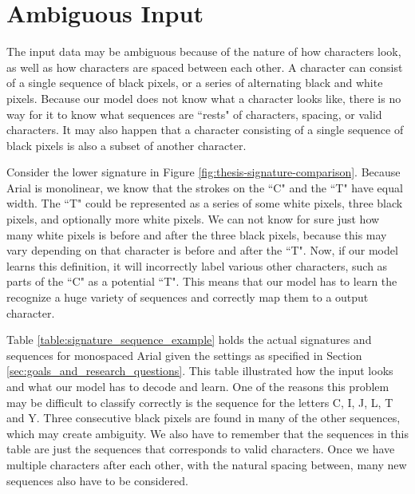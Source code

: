 
\section{Ambiguous Input}
\label{sec:ambiguous_input}
The input data may be ambiguous because of the nature of how characters look, as well as how characters are spaced between each other. A character can consist of a single sequence of black pixels, or a series of alternating black and white pixels. Because our model does not know what a character looks like, there is no way for it to know what sequences are ``rests" of characters, spacing, or valid characters. It may also happen that a character consisting of a single sequence of black pixels is also a subset of another character. 

Consider the lower signature in Figure \ref{fig:thesis-signature-comparison}. Because Arial is monolinear, we know that the strokes on the ``C" and the ``T" have equal width. The ``T" could be represented as a series of some white pixels, three black pixels, and optionally more white pixels. We can not know for sure just how many white pixels is before and after the three black pixels, because this may vary depending on that character is before and after the ``T". Now, if our model learns this definition, it will incorrectly label various other characters, such as parts of the ``C" as a potential ``T". This means that our model has to learn the recognize a huge variety of sequences and correctly map them to a output character.

Table \ref{table:signature_sequence_example} holds the actual signatures and sequences for monospaced Arial given the settings as specified in Section \ref{sec:goals_and_research_questions}. This table illustrated how the input looks and what our model has to decode and learn. One of the reasons this problem may be difficult to classify correctly is the sequence for the letters C, I, J, L, T and Y. Three consecutive black pixels are found in many of the other sequences, which may create ambiguity. We also have to remember that the sequences in this table are just the sequences that corresponds to valid characters. Once we have multiple characters after each other, with the natural spacing between, many new sequences also have to be considered.

